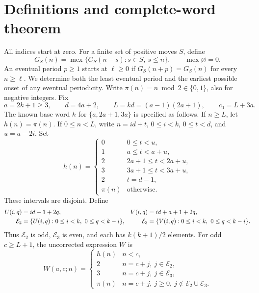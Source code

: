 \documentclass[10pt,a4paper]{article}
\newcommand{\mex}{\operatorname{mex}}
\newcommand{\E}{\mathcal E}
\newcommand{\p}{\pi}
\begin{document}
\section{Definitions and complete-word theorem}
All indices start at zero. For a finite set of positive moves $S$, define
\begin{equation}\label{mex}
 G_S(n)=\mex\{G_S(n-s):s\in S,\ s\le n\},\qquad \mex\varnothing=0.
\end{equation}
An eventual period $p\ge1$ starts at $\ell\ge0$ if $G_S(n+p)=G_S(n)$ for every $n\ge\ell$. We determine both the least eventual period and the earliest possible onset of any eventual periodicity. Write $\p(n)=n\bmod2\in\{0,1\}$, also for negative integers. Fix
\begin{equation}\label{params}
 a=2k+1\ge3,\qquad d=4a+2,\qquad L=kd=(a-1)(2a+1),\qquad c_0=L+3a.
\end{equation}
The known base word $h$ for $\{a,2a+1,3a\}$ is specified as follows. If $n\ge L$, let $h(n)=\p(n)$. If $0\le n<L$, write $n=id+t$, $0\le i<k$, $0\le t<d$, and $u=a-2i$. Set
\begin{equation}\label{h}
 h(n)=\begin{cases}
 0&0\le t<u,\\
 1&a\le t<a+u,\\
 2&2a+1\le t<2a+u,\\
 3&3a+1\le t<3a+u,\\
 2&t=d-1,\\
 \p(n)&\text{otherwise}.
 \end{cases}
\end{equation}
These intervals are disjoint. Define
\begin{align}\label{Esets}
 U(i,q)&=id+1+2q,& V(i,q)&=id+a+1+2q,\\
 \E_2&=\{U(i,q):0\le i<k,\ 0\le q<k-i\},&
 \E_3&=\{V(i,q):0\le i<k,\ 0\le q<k-i\}.\notag
\end{align}
Thus $\E_2$ is odd, $\E_3$ is even, and each has $k(k+1)/2$ elements. For odd $c\ge L+1$, the uncorrected expression $W$ is
\begin{equation}\label{W}
 W(a,c;n)=\begin{cases}
 h(n)&n<c,\\
 2&n=c+j,\ j\in\E_2,\\
 3&n=c+j,\ j\in\E_3,\\
 \p(n)&n=c+j,\ j\ge0,\ j\notin\E_2\cup\E_3.
 \end{cases}
\end{equation}
\end{document}
